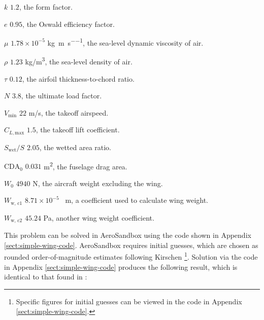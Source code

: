 \begin{example}
    \begin{eqexpl}
        \item{$k$} $1.2$, the form factor.
        \item{$e$} $0.95$, the Oswald efficiency factor.
        \item{$\mu$} $1.78 \times 10^{-5}$ \si{\kg\per\meter\per\second}, the sea-level dynamic viscosity of air.
        \item{$\rho$} $1.23$ \si{\kg/\meter\cubed}, the sea-level density of air.
        \item{$\tau$} $0.12$, the airfoil thickness-to-chord ratio.
        \item{$N$} $3.8$, the ultimate load factor.
        \item{$V_\text{min}$} $22$ \si{\meter/\second}, the takeoff airspeed.
        \item{$C_{L, \text{max}}$} $1.5$, the takeoff lift coefficient.
        \item{$S_\text{wet}/S$} $2.05$, the wetted area ratio.
        \item{$\text{CDA}_0$} $0.031$ \si{\meter\squared}, the fuselage drag area.
        \item{$W_0$} $4940$ \si{\newton}, the aircraft weight excluding the wing.
        \item{$W_\text{w, c1}$} $8.71 \times 10^{-5}$ \si{\per\meter}, a coefficient used to calculate wing weight.
        \item{$W_\text{w, c2}$} $45.24$ \si{\Pa}, another wing weight coefficient.
    \end{eqexpl}
\end{example}

This problem can be solved in AeroSandbox using the code shown in Appendix \ref{sect:simple-wing-code}. AeroSandbox requires initial guesses, which are chosen as rounded order-of-magnitude estimates following Kirschen \cite{kirschen}\footnote{Specific figures for initial guesses can be viewed in the code in Appendix \ref{sect:simple-wing-code}.}. Solution via the code in Appendix \ref{sect:simple-wing-code} produces the following result, which is identical to that found in \cite{hoburg}:

